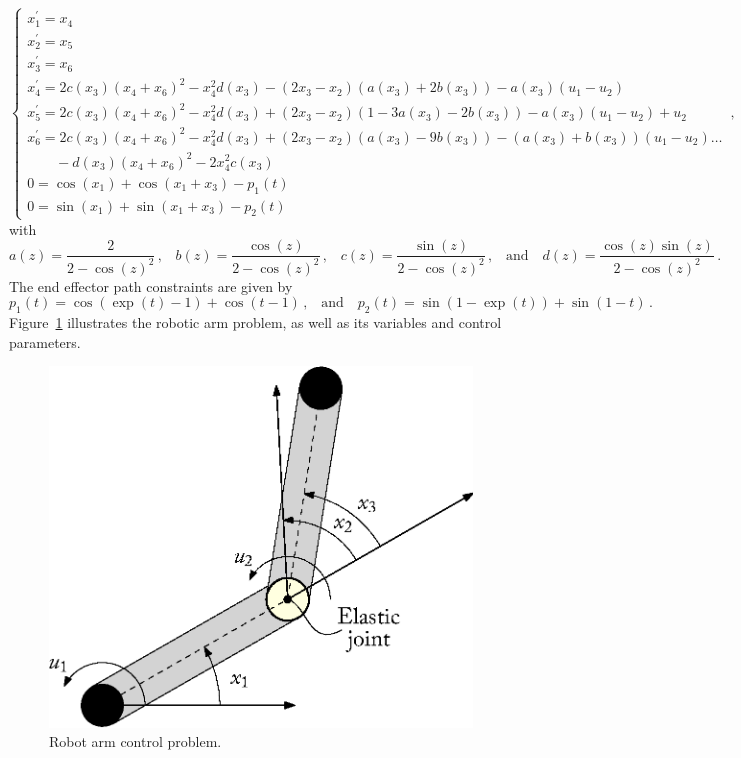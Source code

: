 \begin{equation}
  \begin{cases}
    x_1^{\prime} = x_4 \\
    x_2^{\prime} = x_5 \\
    x_3^{\prime} = x_6 \\
    x_4^{\prime} = 2c(x_3)(x_4+x_6)^2 - x_4^2d(x_3) - (2x_3-x_2)(a(x_3)+2b(x_3)) - a(x_3)(u_1-u_2) \\
    x_5^{\prime} = 2c(x_3)(x_4+x_6)^2 - x_4^2d(x_3) + (2 x_3-x_2)(1-3a(x_3)-2b(x_3)) - a(x_3)(u_1-u_2) + u_2 \\
    x_6^{\prime} = 2c(x_3)(x_4+x_6)^2 - x_4^2d(x_3) + (2 x_3-x_2)(a(x_3)-9b(x_3)) - (a(x_3)+b(x_3))(u_1-u_2) \dots \\
    \qquad - d(x_3)(x_4+x_6)^2 - 2x_4^2c(x_3) \\
    0 = \cos(x_1) + \cos(x_1+x_3) - p_1(t) \\
    0 = \sin(x_1) + \sin(x_1+x_3) - p_2(t)
  \end{cases} \, \text{,}
\end{equation}
%
with
%
\begin{equation}
  a(z) = \dfrac{2}{2-\cos(z)^2} \, \text{,}
  \quad
  b(z) = \dfrac{\cos(z)}{2-\cos(z)^2} \, \text{,}
  \quad
  c(z) = \dfrac{\sin(z)}{2-\cos(z)^2} \, \text{,}
  \quad \text{and} \quad
  d(z) = \dfrac{\cos(z)\sin(z)}{2-\cos(z)^2} \, \text{.}
\end{equation}
%
The end effector path constraints are given by
%
\begin{equation}
  p_1(t) = \cos(\exp(t) - 1) + \cos(t - 1) \, \text{,}
  \quad \text{and} \quad
  p_2(t) = \sin(1 - \exp(t)) + \sin(1 - t) \, \text{.}
\end{equation}
%
Figure~\ref{chap4:fig:robotic_arm} illustrates the robotic arm problem, as well as its variables and control parameters.

\begin{figure}[htb]
  \centering
  \includegraphics[width=0.4\linewidth]{figures/chapter_4/robotic_arm.eps}
  \caption{Robot arm control problem.}
  \label{chap4:fig:robotic_arm}
\end{figure}

